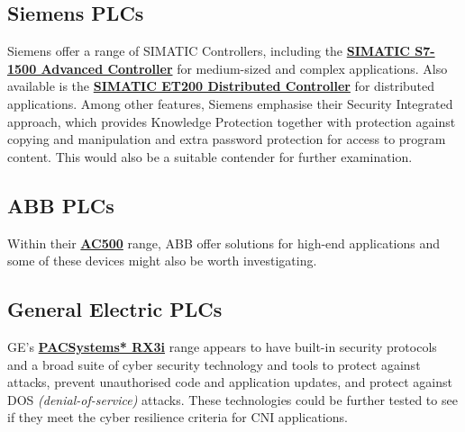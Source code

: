 \subsection{Siemens PLCs}
Siemens offer a range of SIMATIC Controllers, including the \href{https://www.siemens.com/global/en/home/products/automation/systems/industrial/plc/simatic-s7-1500.html}{\textbf{SIMATIC S7-1500 Advanced Controller}} for medium-sized and complex applications. Also available is the \href{https://w3.siemens.com/mcms/distributed-io/en/pages/default.aspx}{\textbf{SIMATIC ET200 Distributed Controller}} for distributed applications. Among other features, Siemens emphasise their Security Integrated approach, which provides Knowledge Protection together with protection against copying and manipulation and extra password protection for access to program content. This would also be a suitable contender for further examination.
\subsection{ABB PLCs}
Within their \href{http://new.abb.com/plc/programmable-logic-controllers-plcs/ac500}{\textbf{AC500}} range, ABB offer solutions for high-end applications and some of these devices might also be worth investigating.
\subsection{General Electric PLCs}
GE's \href{http://www.geautomation.com/products/pacsystems-rx3i-controller}{\textbf{PACSystems* RX3i}} range appears to have built-in security protocols and a broad suite of cyber security technology and tools to protect against attacks, prevent unauthorised code and application updates, and protect against DOS \textit{(denial-of-service)} attacks. These technologies could be further tested to see if they meet the cyber resilience criteria for CNI applications.





